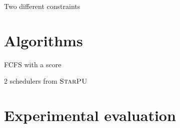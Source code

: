 \documentclass{libs/ufc_format}
\newcommand{\starpu}{\textsc{StarPU}\xspace}
\begin{document}
{\begin{frame}{Two different constraints}
\end{frame}

\section{Algorithms}

\begin{frame}{FCFS with a score}
	\begin{block}{2 schedulers from $\starpu$}
		
	\end{block}
\end{frame}

\section{Experimental evaluation}
}
\end{document}
